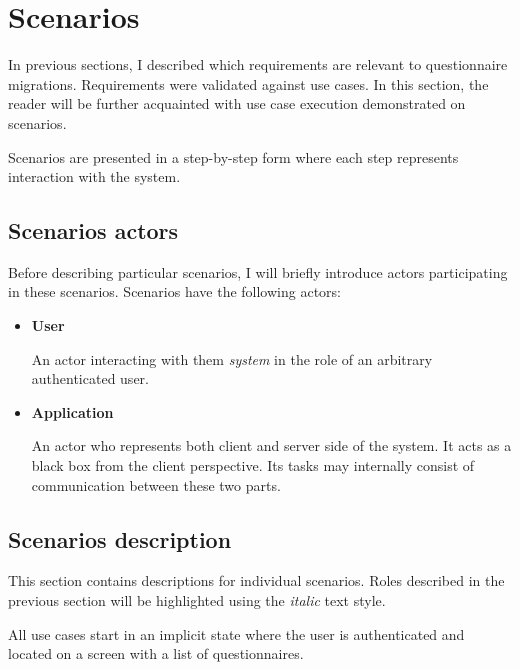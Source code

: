 \section{Scenarios}\label{sec:scenarios}

In previous sections, I described which requirements are relevant to questionnaire migrations.
Requirements were validated against use cases.
In this section, the reader will be further acquainted with use case execution demonstrated on scenarios.

Scenarios are presented in a step-by-step form where each step represents interaction with the system.

\subsection{Scenarios actors}\label{sec:scenarios-actors}

Before describing particular scenarios, I will briefly introduce actors participating in these scenarios.
Scenarios have the following actors:

\begin{itemize}
    \item \textbf{User}

    An actor interacting with them \textit{system} in the role of an arbitrary authenticated user.

    \item \textbf{Application}
    
    An actor who represents both client and server side of the system.
    It acts as a black box from the client perspective.
    Its tasks may internally consist of communication between these two parts.

\end{itemize}

\subsection{Scenarios description}\label{sec:scenarios-description}

This section contains descriptions for individual scenarios.
Roles described in the previous section will be highlighted using the \textit{italic} text style.

All use cases start in an implicit state where the user is authenticated and located on a screen with a list of questionnaires.

